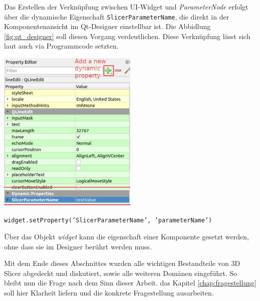 \begin{minipage}{0.35\textwidth}
	Das Erstellen der Verknüpfung zwischen UI-Widget und \textit{ParameterNode}
	erfolgt über die dynamische Eigenschaft \texttt{SlicerParameterName}, die
	direkt in der Komponentenansicht im Qt-Designer einstellbar ist. Die Abbidlung
	\ref{fig:qt_designer} soll diesen Vorgang verdeutlichen. Diese Verknüpfung
	lässt sich laut \citet{slicer2024} auch via Programmcode setzten.
\end{minipage}
\hfill
\begin{minipage}{0.55\textwidth}
	\centering
	\includegraphics[width=0.5\textwidth]{img/qt_designer.jpg}
	\label{fig:qt_designer}
\end{minipage}

\texttt{widget.setProperty('SlicerParameterName', 'parameterName')}

Über das Objekt \textit{widget} kann die eigenschaft einer Komponente gesetzt
werden, ohne dass sie im Designer berührt werden muss.

Mit dem Ende dieses Abschnittes wurden alle wichtigen Bestandteile von 3D Slicer
abgedeckt und diskutiert, sowie alle weiteren Domänen eingeführt. So bleibt nun die
Frage nach dem Sinn dieser Arbeit. das Kapitel \ref{chap:fragestellung} soll
hier Klarheit liefern und die konkrete Fragestellung ausarbeiten.
